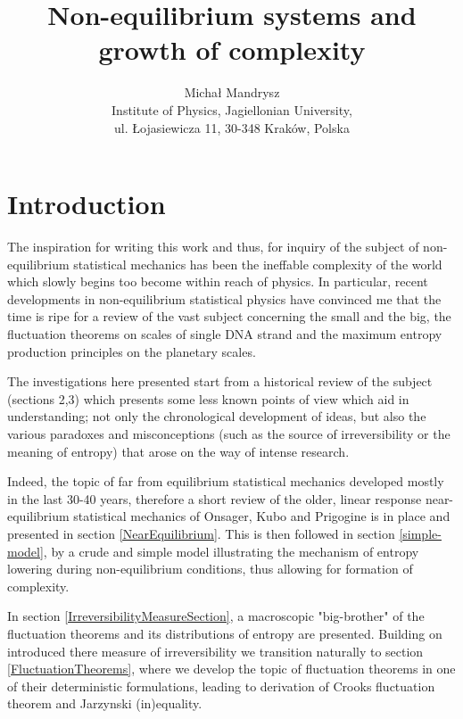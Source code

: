 \documentclass[a4paper,12pt]{article}
\begin{document}
\title{Non-equilibrium systems and growth of complexity}

\author{Michał Mandrysz \\
Institute of Physics, Jagiellonian University, \\ul. Łojasiewicza
11, 30-348 Kraków, Polska }

\maketitle

\tableofcontents

\newpage

\section{Introduction}

The inspiration for writing this work and thus, for inquiry of the subject of non-equilibrium statistical mechanics has been the ineffable complexity of the world which slowly begins too become within reach of physics. 
In particular, recent developments in non-equilibrium statistical physics have convinced me that the time is ripe for a review of the vast subject concerning the small and the big, the fluctuation theorems on scales of single DNA strand and the maximum entropy production principles on the planetary scales.

The investigations here presented start from a historical review of the subject (sections 2,3) which presents some less known points of view which aid in understanding; not only the chronological development of ideas, but also the various paradoxes and misconceptions (such as the source of irreversibility or the meaning of entropy) that arose on the way of intense research. 

Indeed, the topic of far from equilibrium statistical mechanics developed mostly in the last 30-40 years, therefore a short review of the older, linear response near-equilibrium statistical mechanics of Onsager, Kubo and Prigogine is in place and presented in section \ref{NearEquilibrium}. This is then followed in section \ref{simple-model}, by a crude and simple model illustrating the mechanism of entropy lowering during non-equilibrium conditions, thus allowing for formation of complexity.

In section \ref{IrreversibilityMeasureSection},  a macroscopic "big-brother" of the fluctuation theorems and its distributions of entropy are presented. Building on introduced there measure of irreversibility we transition naturally to section \ref{FluctuationTheorems}, where we develop the topic of fluctuation theorems in one of their deterministic formulations, leading to derivation of Crooks fluctuation theorem and Jarzynski (in)equality.
\end{document}
